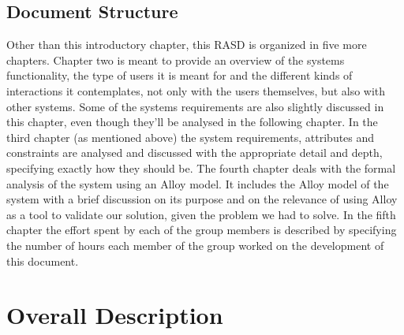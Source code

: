 \documentclass[12pt]{article}
\begin{document}
\subsection{Document Structure}
Other than this introductory chapter, this RASD is organized in five more chapters. Chapter two is meant to provide an overview of the systems functionality, the type of users it is meant for and the different kinds of interactions it contemplates, not only with the users themselves, but also with other systems. Some of the systems requirements are also slightly discussed in this chapter, even though they’ll be analysed in the following chapter. In the third chapter (as mentioned above) the system requirements, attributes and constraints are analysed and discussed with the appropriate detail and depth, specifying exactly how they should be.
The fourth chapter deals with the formal analysis of the system using an Alloy model. It includes the Alloy model of the system with a brief discussion on its purpose and on the relevance of using Alloy as a tool to validate our solution, given the problem we had to solve.
In the fifth chapter the effort spent by each of the group members is described by specifying the number of hours each member of the group worked on the development of this document.

\section{Overall Description}
\end{document}
